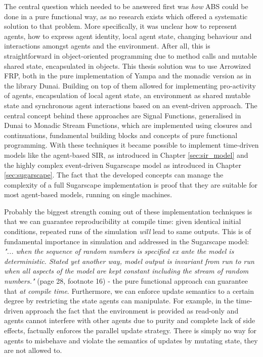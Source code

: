 The central question which needed to be answered first was \textit{how} ABS could be done in a pure functional way, as no research exists which offered a systematic solution to that problem. More specifically, it was unclear how to represent agents, how to express agent identity, local agent state, changing behaviour and interactions amongst agents and the environment. After all, this is straightforward in object-oriented programming due to method calls and mutable shared state, encapsulated in objects. This thesis solution was to use Arrowized FRP, both in the pure implementation of Yampa and the monadic version as in the library Dunai. Building on top of them allowed for implementing pro-activity of agents, encapsulation of local agent state, an environment as shared mutable state and synchronous agent interactions based on an event-driven approach. The central concept behind these approaches are Signal Functions, generalised in Dunai to Monadic Stream Functions, which are implemented using closures and continuations, fundamental building blocks and concepts of pure functional programming. With these techniques it became possible to implement time-driven models like the agent-based SIR, as introduced in Chapter \ref{sec:sir_model} and the highly complex event-driven Sugarscape model as introduced in Chapter \ref{sec:sugarscape}. The fact that the developed concepts can manage the complexity of a full Sugarscape implementation is proof that they are suitable for most agent-based models, running on single machines. 

\medskip

Probably the biggest strength coming out of these implementation techniques is that we can guarantee reproducibility at compile time: given identical initial conditions, repeated runs of the simulation \textit{will} lead to same outputs. This is of fundamental importance in simulation and addressed in the Sugarscape model: \textit{"... when the sequence of random numbers is specified ex ante the model is deterministic. Stated yet another way, model output is invariant from run to run when all aspects of the model are kept constant including the stream of random numbers."} (page 28, footnote 16) - the pure functional approach can guarantee that \textit{at compile time}. Furthermore, we can enforce update semantics to a certain degree by restricting the state agents can manipulate. For example, in the time-driven approach the fact that the environment is provided as read-only and agents cannot interfere with other agents due to purity and complete lack of side effects, factually enforces the parallel update strategy. There is simply no way for agents to misbehave and violate the semantics of updates by mutating state, they are not allowed to.

